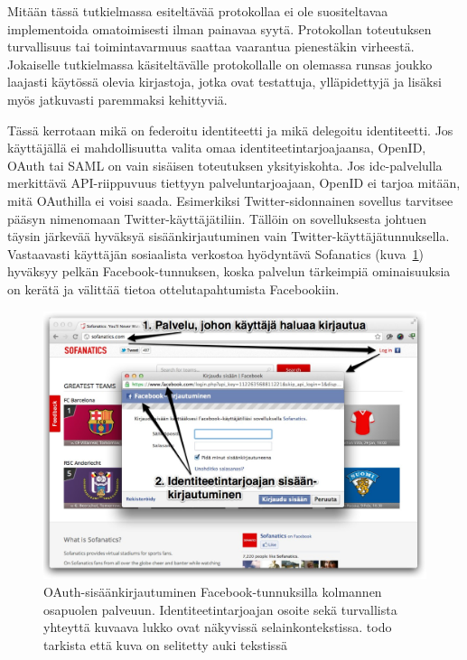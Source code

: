 \documentclass[finnish,gradu]{tktltiki}
\begin{document}
  Mitään tässä tutkielmassa esiteltävää protokollaa ei ole suositeltavaa implementoida omatoimisesti ilman painavaa syytä. Protokollan toteutuksen turvallisuus tai toimintavarmuus saattaa vaarantua pienestäkin virheestä. Jokaiselle tutkielmassa käsiteltävälle protokollalle on olemassa runsas joukko laajasti käytössä olevia kirjastoja, jotka ovat testattuja, ylläpidettyjä ja lisäksi myös jatkuvasti paremmaksi kehittyviä.

  Tässä kerrotaan mikä on federoitu identiteetti ja mikä delegoitu identiteetti.
  Jos käyttäjällä ei mahdollisuutta valita omaa identiteetintarjoajaansa, OpenID, OAuth tai SAML on vain sisäisen toteutuksen yksityiskohta. Jos idc-palvelulla merkittävä API-riippuvuus tiettyyn palveluntarjoajaan, OpenID ei tarjoa mitään, mitä OAuthilla ei voisi saada. Esimerkiksi Twitter-sidonnainen sovellus tarvitsee pääsyn nimenomaan Twitter-käyttäjätiliin. Tällöin on sovelluksesta johtuen täysin järkevää hyväksyä sisäänkirjautuminen vain Twitter-käyttäjätunnuksella. Vastaavasti käyttäjän sosiaalista verkostoa hyödyntävä Sofanatics (kuva~\ref{fig:facebook_oauth_login}) hyväksyy pelkän Facebook-tunnuksen, koska palvelun tärkeimpiä ominaisuuksia on kerätä ja välittää tietoa ottelutapahtumista Facebookiin.


  \begin{figure}
    \centering
    \includegraphics[width=1.0\textwidth]{images/facebook_popup_login.jpg}
    \caption{OAuth-sisäänkirjautuminen Facebook-tunnuksilla kolmannen osapuolen palveuun. Identiteetintarjoajan osoite sekä turvallista yhteyttä kuvaava lukko ovat näkyvissä selainkontekstissa. todo tarkista että kuva on selitetty auki tekstissä}
    \label{fig:facebook_oauth_login}
  \end{figure}
\end{document}
